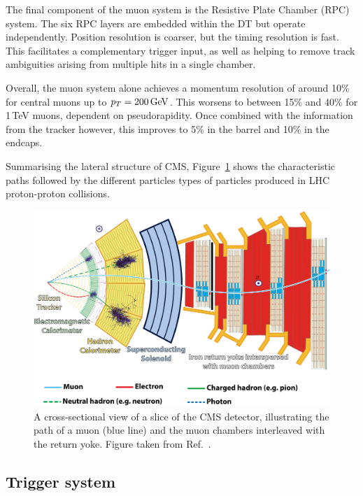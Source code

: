 The final component of the muon system is the Resistive Plate Chamber (RPC) system.
The six RPC layers are embedded within the DT but operate independently.
Position resolution is coarser, but the timing resolution is fast.
This facilitates a complementary trigger input, as well as helping to remove track ambiguities arising from multiple hits in a single chamber. %

Overall, the muon system alone achieves a momentum resolution of around 10\% for central muons up to $p_T=200\,\textrm{GeV}$.
This worsens to between 15\% and 40\% for 1\,TeV muons, dependent on pseudorapidity.
Once combined with the information from the tracker however, this improves to 5\% in the barrel and 10\% in the endcaps.

Summarising the lateral structure of CMS, 
Figure~\ref{fig:detector_CMSslice} shows the characteristic paths followed by the different particles types of particles produced in LHC proton-proton collisions.

\begin{figure}[h!]
  \centering
  \includegraphics[width=\textwidth]{Figures/Detector/CMSslice.png}
  \caption[A cross-sectional view of the CMS detector]
  {A cross-sectional view of a slice of the CMS detector, 
  illustrating the path of a muon (blue line) 
  and the muon chambers interleaved with the return yoke.
  Figure taken from Ref.~\cite{CMSslice}.}
  \label{fig:detector_CMSslice}
\end{figure}

\subsection{Trigger system}

